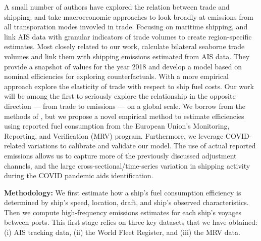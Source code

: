\documentclass[hidelinks, 12pt,letterpaper]{article}
\begin{document}
A small number of authors have explored the relation between trade and shipping. \citet{cristea2013trade} and \citet{shapiro2016trade} take macroeconomic approaches to look broadly at emissions from all transporation modes invovled in trade. Focusing on maritime shipping, \citet{van2018spatially} and \citet{liu2019emissions} link AIS data with granular indicators of trade volumes to create region-specific estimates. Most closely related to our work, \citet{wang2021trade} calculate bilateral seaborne trade volumes and link them with shipping emissions estimated from AIS data. They provide a snapshot of values for the year 2018 and develop a model based on nominal efficiencies for exploring counterfactuals. With a more empirical approach \citet{brancaccio2018impact} explore the elasticity of trade with respect to ship fuel costs. Our work will be among the first to seriously explore the relationship in the opposite direction --- from trade to emissions --- on a global scale. We borrow from the methods of \citet{wang2021trade}, but we propose a novel empirical method to estimate efficiencies using reported fuel consumption from the European Union's Monitoring, Reporting, and Verification (MRV) program. Furthermore, we leverage COVID-related variations to calibrate and validate our model. The use of actual reported emissions allows us to capture more of the previously discussed adjustment channels, and the large cross-sectional/time-series variation in shipping activity during the COVID pandemic aids identification. %


\smallskip

\noindent \textbf{Methodology:}  We first estimate how a ship's fuel consumption efficiency is determined by ship's speed, location, draft, and ship's observed characteristics. Then we compute high-frequency emissions estimates for each ship's voyages between ports. This first stage relies on three key datasets that we have obtained: (i) AIS tracking data, (ii) the World Fleet Register, and (iii) the MRV data.
\end{document}
